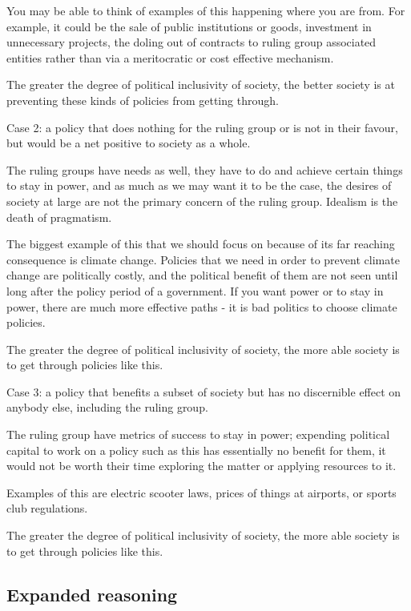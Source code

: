 \documentclass[twoside]{article}
\begin{document}
You may be able to think of examples of this happening where you are from. For example, it could be the sale of public institutions or goods, investment in unnecessary projects, the doling out of contracts to ruling group associated entities rather than via a meritocratic or cost effective mechanism.

The greater the degree of political inclusivity of society, the better society is at preventing these kinds of policies from getting through.

Case 2: a policy that does nothing for the ruling group or is not in their favour, but would be a net positive to society as a whole.

The ruling groups have needs as well, they have to do and achieve certain things to stay in power, and as much as we may want it to be the case, the desires of society at large are not the primary concern of the ruling group. Idealism is the death of pragmatism.

The biggest example of this that we should focus on because of its far reaching consequence is climate change. Policies that we need in order to prevent climate change are politically costly, and the political benefit of them are not seen until long after the policy period of a government. If you want power or to stay in power, there are much more effective paths - it is bad politics to choose climate policies.

The greater the degree of political inclusivity of society, the more able society is to get through policies like this.

Case 3: a policy that benefits a subset of society but has no discernible effect on anybody else, including the ruling group.

The ruling group have metrics of success to stay in power; expending political capital to work on a policy such as this has essentially no benefit for them, it would not be worth their time exploring the matter or applying resources to it.

Examples of this are electric scooter laws, prices of things at airports, or sports club regulations.

The greater the degree of political inclusivity of society, the more able society is to get through policies like this.

\subsection{Expanded reasoning}
\end{document}
